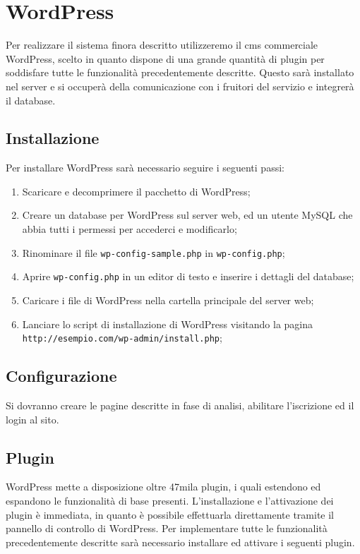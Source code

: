\section{WordPress} \label{cms:wp}
Per realizzare il sistema finora descritto utilizzeremo il \gls{cms} commerciale WordPress, scelto in quanto dispone di una grande quantità di plugin per soddisfare tutte le funzionalità precedentemente descritte. Questo sarà installato nel server e si occuperà della comunicazione con i fruitori del servizio e integrerà il database.

\subsection{Installazione}
Per installare WordPress sarà necessario seguire i seguenti passi:
\begin{enumerate}
	\item Scaricare e decomprimere il pacchetto di WordPress;
	\item Creare un database per WordPress sul server web, ed un utente MySQL che abbia tutti i permessi per accederci e modificarlo;
	\item Rinominare il file \texttt{wp-config-sample.php} in \texttt{wp-config.php};
	\item Aprire \texttt{wp-config.php} in un editor di testo e inserire i dettagli del database;
	\item Caricare i file di WordPress nella cartella principale del server web;
	\item Lanciare lo script di installazione di WordPress visitando la pagina \texttt{http://esempio.com/wp-admin/install.php};
\end{enumerate}

\subsection{Configurazione}
Si dovranno creare le pagine descritte in fase di analisi, abilitare l'iscrizione ed il login al sito.

\subsection{Plugin} \label{sec_plugin}
WordPress mette a disposizione oltre 47mila plugin, i quali estendono ed espandono le funzionalità di base presenti.
L'installazione e l'attivazione dei plugin è immediata, in quanto è possibile effettuarla direttamente tramite il pannello di controllo di WordPress.
Per implementare tutte le funzionalità precedentemente descritte sarà necessario installare ed attivare i seguenti plugin.

